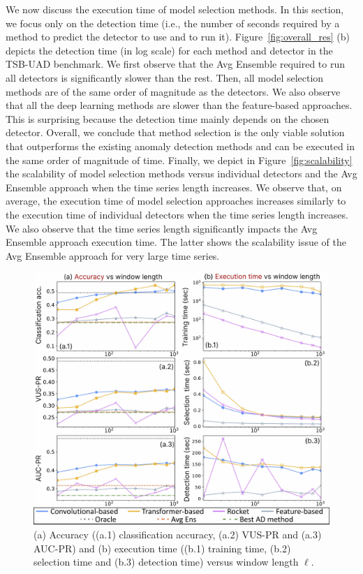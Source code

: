 We now discuss the execution time of model selection methods. In this section, we focus only on the detection time (i.e., the number of seconds required by a method to predict the detector to use and to run it). Figure~\ref{fig:overall_res} (b) depicts the detection time (in log scale) for each method and detector in the TSB-UAD benchmark. We first observe that the Avg Ensemble required to run all detectors is significantly slower than the rest. Then, all model selection methods are of the same order of magnitude as the detectors. We also observe that all the deep learning methods are slower than the feature-based approaches. This is surprising because the detection time mainly depends on the chosen detector. Overall, we conclude that method selection is the only viable solution that outperforms the existing anomaly detection methods and can be executed in the same order of magnitude of time. Finally, we depict in Figure~\ref{fig:scalability} the scalability of model selection methods versus individual detectors and the Avg Ensemble approach when the time series length increases. We observe that, on average, the execution time of model selection approaches increases similarly to the execution time of individual detectors when the time series length increases. We also observe that the time series length significantly impacts the Avg Ensemble approach execution time. The latter shows the scalability issue of the Avg Ensemble approach for very large time series.

\begin{figure}
    \centering
    \includegraphics[width=\linewidth]{figures/Fig8.jpg}
        \caption{(a) Accuracy ((a.1) classification accuracy, (a.2) VUS-PR and (a.3) AUC-PR) and (b) execution time ((b.1) training time, (b.2) selection time and (b.3) detection time) versus window length $\ell$.}
        \label{fig:lengthinfl}
\end{figure}

